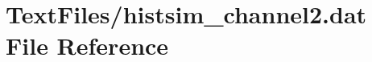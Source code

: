 \hypertarget{TextFiles_2histsim__channel2_8dat}{}\section{Text\+Files/histsim\+\_\+channel2.dat File Reference}
\label{TextFiles_2histsim__channel2_8dat}
